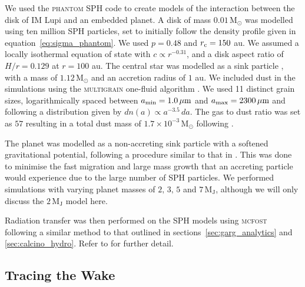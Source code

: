 We used the \textsc{phantom} SPH code \citep{price2018} to create models of the interaction between the disk of IM Lupi and an embedded planet.
A disk of mass $0.01 \, \mathrm{M_\odot}$ was modelled using ten million SPH particles, set to initially follow the density profile given in equation~\ref{eq:sigma_phantom}.
We used $p=0.48$ \citep{pinte2018} and $r_{\rm c}=150$ au.
We assumed a locally isothermal equation of state with $c \propto r^{-0.31}$, and a disk aspect ratio of $H/r=0.129$ at $r=100$ au.
The central star was modelled as a sink particle \citep{bate1995}, with a mass of $1.12 \, \mathrm{M_\odot}$ \citep{andrews2018} and an accretion radius of $1$ au.
We included dust in the simulations using the \textsc{multigrain} one-fluid algorithm \citep{price2015,ballabio2018,hutchison2018,price2018}.
We used 11 distinct grain sizes, logarithmically spaced between $a_{\rm min}=1.0 \, \mathrm{\mu m}$ and $a_{\rm max}=2300 \, \mathrm{\mu m}$ and following a distribution given by $dn(a) \propto a^{-3.5} \, da$.
The gas to dust ratio was set as $57$ resulting in a total dust mass of $1.7 \times 10^{-3} \, \mathrm{M_\odot}$ following \citep{pinte2018}. 

The planet was modelled as a non-accreting sink particle with a softened gravitational potential, following a procedure similar to that in \citet{szulagyi2016}.
This was done to minimise the fast migration and large mass growth that an accreting particle would experience due to the large number of SPH particles.
We performed simulations with varying planet masses of $2, \, 3, \, 5$ and $7\, \mathrm{M_J}$, although we will only discuss the $2 \, \mathrm{M_J}$ model here.

Radiation transfer was then performed on the SPH models using \textsc{mcfost} \citep{pinte2006,pinte2009} following a similar method to that outlined in sections~\ref{sec:garg_analytics} and \ref{sec:calcino_hydro}.
Refer to \citet{verrios2022} for further detail.

\subsection{Tracing the Wake}

